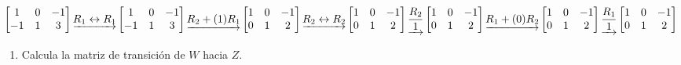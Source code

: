\documentclass[
  11,
]{article}
\providecommand{\tightlist}{%
  \setlength{\itemsep}{0pt}\setlength{\parskip}{0pt}}
\begin{document}
\[
  \left[\begin{matrix}1 & 0 & -1\\-1 & 1 & 3\end{matrix}\right]
\underrightarrow{ R_{1} \leftrightarrow R_{1} }
\left[\begin{matrix}1 & 0 & -1\\-1 & 1 & 3\end{matrix}\right]
\underrightarrow{ R_2 + (1)R_1 }
\left[\begin{matrix}1 & 0 & -1\\0 & 1 & 2\end{matrix}\right]
\underrightarrow{ R_{2} \leftrightarrow R_{2} }
\left[\begin{matrix}1 & 0 & -1\\0 & 1 & 2\end{matrix}\right]
\underrightarrow{ \frac{R_2}{1} }
\left[\begin{matrix}1 & 0 & -1\\0 & 1 & 2\end{matrix}\right]
\underrightarrow{ R_1 + (0)R_2 }
\\
\left[\begin{matrix}1 & 0 & -1\\0 & 1 & 2\end{matrix}\right]
\underrightarrow{ \frac{R_1}{1} }
\left[\begin{matrix}1 & 0 & -1\\0 & 1 & 2\end{matrix}\right]
\]

\begin{enumerate}
\def\labelenumi{\alph{enumi})}
\setcounter{enumi}{1}
\tightlist
\item
  Calcula la matriz de transición de \(W\) hacia \(Z\).
\end{enumerate}
\end{document}
